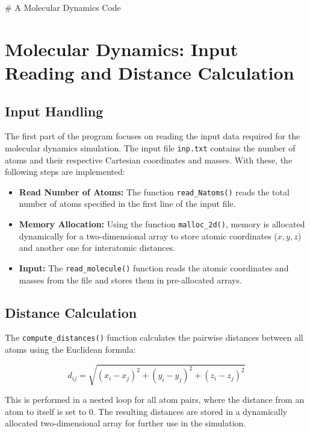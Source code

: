 # A Molecular Dynamics Code
\section{Molecular Dynamics: Input Reading and Distance Calculation}

\subsection{Input Handling}
The first part of the program focuses on reading the input data required for the molecular dynamics simulation. The input file \texttt{inp.txt} contains the number of atoms and their respective Cartesian coordinates and masses. With these, the following steps are implemented:

\begin{itemize}
    \item \textbf{Read Number of Atoms:}
    The function \texttt{read\_Natoms()} reads the total number of atoms specified in the first line of the input file.
    \item \textbf{Memory Allocation:}
    Using the function \texttt{malloc\_2d()}, memory is allocated dynamically for a two-dimensional array to store atomic coordinates (\(x, y, z\)) and another one for interatomic distances.
    \item \textbf{Input:}
    The \texttt{read\_molecule()} function reads the atomic coordinates and masses from the file and stores them in pre-allocated arrays.
\end{itemize}

\subsection{Distance Calculation}
The \texttt{compute\_distances()} function calculates the pairwise distances between all atoms using the Euclidean formula:

\begin{equation}
d_{ij} = \sqrt{(x_{i} - x_{j})^2 + (y_{i} - y_{j})^2 + (z_{i} - z_{j})^2}
\end{equation}

This is performed in a nested loop for all atom pairs, where the distance from an atom to itself is set to 0. The resulting distances are stored in a dynamically allocated two-dimensional array for further use in the simulation.

